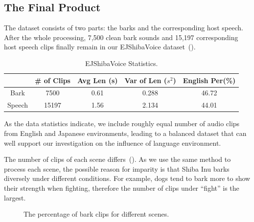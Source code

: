 \subsection{The Final Product}
The dataset consists of two parts: the barks and the corresponding host speech. After the whole processing, 7,500 clean bark sounds and 15,197 corresponding host speech clips 
finally remain in our EJShibaVoice dataset~().

\begin{table}[th]
	\tiny
	\centering
	\begin{tabular}{c|c|c|c|c}
		\toprule
		{}            & \# of Clips & Avg Len (s) & Var of Len ($s^2$) & English Per(\%)\\
		\midrule
		{Bark} & 7500 & 0.61  &  0.288 & 46.72\\
		{Speech} & 15197 & 1.56 & 2.134 & 44.01\\
		\bottomrule
	\end{tabular}
	\caption{EJShibaVoice Statistics.
}
	\label{table:datasetlength}
\end{table}

As the data statistics indicate, we include roughly equal number of audio clips 
from English and Japanese environments, leading to a balanced dataset that can well 
support our investigation on the influence of language environment.

The number of clips of each scene differs~(). 
As we use the same method to process each scene, the possible reason for imparity is that Shiba Inu barks diversely under different conditions. For example, dogs tend to bark more
to show their strength when fighting, therefore the number of clips under ``fight'' is 
the largest.


\begin{figure}[th]
	\centering
	\caption{The percentage of bark clips for different scenes.}
	\label{fig:keyword_rosepie}
\end{figure}
